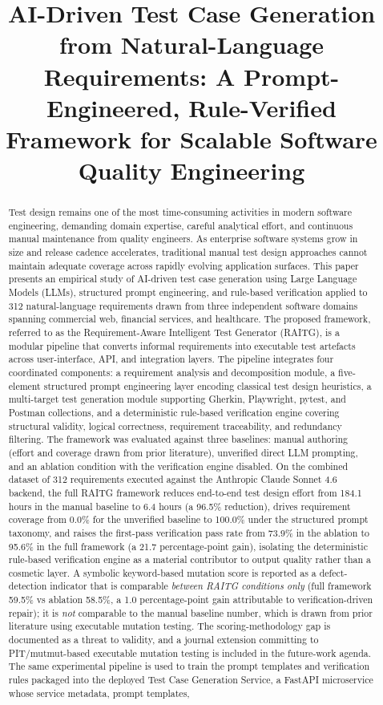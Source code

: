 \documentclass[conference]{IEEEtran}
\title{AI-Driven Test Case Generation from Natural-Language Requirements: A Prompt-Engineered, Rule-Verified Framework for Scalable Software Quality Engineering}
\author{
\IEEEauthorblockN{Vijay P. Javvadi}
\IEEEauthorblockA{
Independent Researcher\\
Email: research@vijayjavvadiresearch.ai\\
LinkedIn: linkedin.com/in/vijayjavvadi\\
Website: vijayjavvadiresearch.ai
}
}
\begin{document}
\maketitle

\begin{abstract}
Test design remains one of the most time-consuming activities in modern software engineering, demanding domain expertise, careful analytical effort, and continuous manual maintenance from quality engineers. As enterprise software systems grow in size and release cadence accelerates, traditional manual test design approaches cannot maintain adequate coverage across rapidly evolving application surfaces. This paper presents an empirical study of AI-driven test case generation using Large Language Models (LLMs), structured prompt engineering, and rule-based verification applied to 312 natural-language requirements drawn from three independent software domains spanning commercial web, financial services, and healthcare. The proposed framework, referred to as the Requirement-Aware Intelligent Test Generator (RAITG), is a modular pipeline that converts informal requirements into executable test artefacts across user-interface, API, and integration layers. The pipeline integrates four coordinated components: a requirement analysis and decomposition module, a five-element structured prompt engineering layer encoding classical test design heuristics, a multi-target test generation module supporting Gherkin, Playwright, pytest, and Postman collections, and a deterministic rule-based verification engine covering structural validity, logical correctness, requirement traceability, and redundancy filtering. The framework was evaluated against three baselines: manual authoring (effort and coverage drawn from prior literature), unverified direct LLM prompting, and an ablation condition with the verification engine disabled. On the combined dataset of 312 requirements executed against the Anthropic Claude Sonnet 4.6 backend, the full RAITG framework reduces end-to-end test design effort from 184.1 hours in the manual baseline to 6.4 hours (a 96.5\% reduction), drives requirement coverage from 0.0\% for the unverified baseline to 100.0\% under the structured prompt taxonomy, and raises the first-pass verification pass rate from 73.9\% in the ablation to 95.6\% in the full framework (a 21.7 percentage-point gain), isolating the deterministic rule-based verification engine as a material contributor to output quality rather than a cosmetic layer. A symbolic keyword-based mutation score is reported as a defect-detection indicator that is comparable \emph{between RAITG conditions only} (full framework 59.5\% vs ablation 58.5\%, a 1.0 percentage-point gain attributable to verification-driven repair); it is \emph{not} comparable to the manual baseline number, which is drawn from prior literature using executable mutation testing. The scoring-methodology gap is documented as a threat to validity, and a journal extension committing to PIT/mutmut-based executable mutation testing is included in the future-work agenda. The same experimental pipeline is used to train the prompt templates and verification rules packaged into the deployed Test Case Generation Service, a FastAPI microservice whose service metadata, prompt templates, 
\end{abstract}
\end{document}
